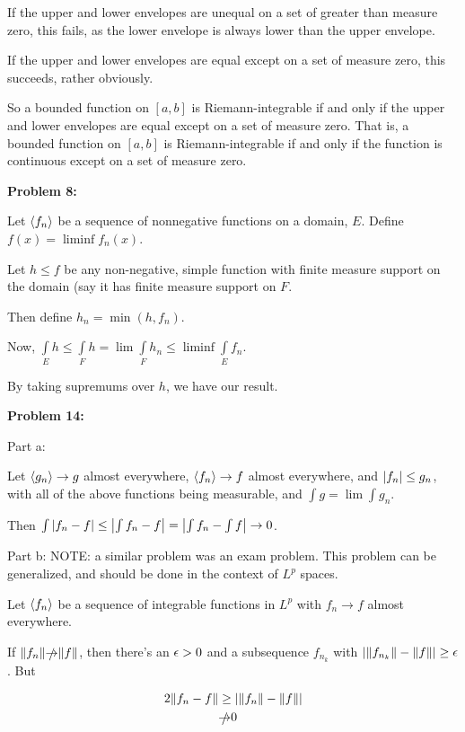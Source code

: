 \documentclass[a4paper,12pt]{article}
\begin{document}
If the upper and lower envelopes are unequal on a set of greater than measure zero, this fails, as the lower envelope is always lower than the upper envelope.

If the upper and lower envelopes are equal except on a set of measure zero, this succeeds, rather obviously.

So a bounded function on $[a,b]$ is Riemann-integrable if and only if the upper and lower envelopes are equal except on a set of measure zero. That is, a bounded function on $[a,b]$ is Riemann-integrable if and only if the function is continuous except on a set of measure zero.

\shunt

{\bf Problem 8:}

Let $\left\langle f_n \right\rangle$ be a sequence of nonnegative functions on a domain, $E$. Define $f(x) = \liminf f_n(x)$.

Let $h \leq f$ be any non-negative, simple function with finite measure support on the domain (say it has finite measure support on $F$. 

Then define $h_n = \min(h,f_n)$.

Now, $\int\limits_E h \leq \int\limits_F h= \lim \int\limits_F h_n \leq \liminf \int\limits_E f_n$.

By taking supremums over $h$, we have our result.

\shunt

{\bf Problem 14:}

Part a:

Let $\left\langle g_n \right\rangle \to g$ almost everywhere, $\left\langle f_n \right\rangle \to f$ almost everywhere, and $\left\lvert f_n \right\rvert \leq g_n$, with all of the above functions being measurable, and $\int g = \lim \int g_n$.

Then $\int \left\lvert f_n-f \right\rvert \leq \left\lvert \int f_n -f \right\rvert = \left\lvert \int f_n - \int f \right\rvert \to 0$.

\shunt

Part b: NOTE: a similar problem was an exam problem. This problem can be generalized, and should be done in the context of $L^p$ spaces.

Let $\left\langle f_n \right\rangle$ be a sequence of integrable functions in $L^p$ with $f_n \to f$ almost everywhere.

If $\|f_n\| \slashed{\to} \|f\|$, then there's an $\epsilon >0$ and a subsequence $f_{n_k}$ with $\left\lvert \|f_{n_k}\| - \|f\| \right\rvert \geq \epsilon$. But

\begin{align*}
2\|f_n - f\| &\geq \left\lvert \|f_n\| - \|f\| \right\rvert\\
&\slashed{\to} 0
\end{align*}
\end{document}
